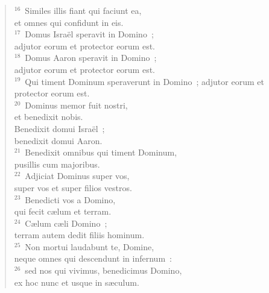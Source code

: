 \begin{flushleft}
\begin{verse}
${}^{16}$~Similes illis fiant qui faciunt ea,\\ et omnes qui confidunt in eis.\\
${}^{17}$~Domus Isra\"el speravit in Domino~;\\ adjutor eorum et protector eorum est.\\
${}^{18}$~Domus Aaron speravit in Domino~;\\ adjutor eorum et protector eorum est.\\
${}^{19}$~Qui timent Dominum speraverunt in Domino~; adjutor eorum et protector eorum est.\\
${}^{20}$~Dominus memor fuit nostri,\\ et benedixit nobis.\\ Benedixit domui Isra\"el~;\\ benedixit domui Aaron.\\
${}^{21}$~Benedixit omnibus qui timent Dominum,\\ pusillis cum majoribus.\\
${}^{22}$~Adjiciat Dominus super vos,\\ super vos et super filios vestros.\\
${}^{23}$~Benedicti vos a Domino,\\ qui fecit c\ae lum et terram.\\
${}^{24}$~C\ae lum c\ae li Domino~;\\ terram autem dedit filiis hominum.\\
${}^{25}$~Non mortui laudabunt te, Domine,\\ neque omnes qui descendunt in infernum~:\\
${}^{26}$~sed nos qui vivimus, benedicimus Domino,\\ ex hoc nunc et usque in s\ae culum.\end{verse}\end{flushleft}


